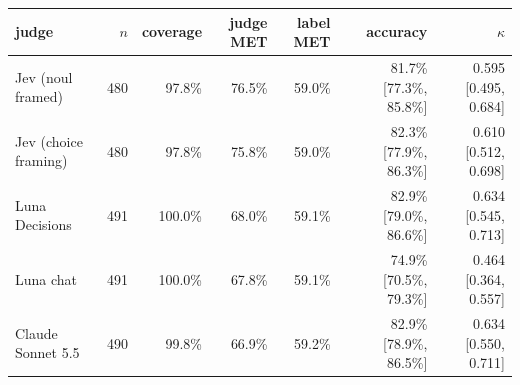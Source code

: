 \begin{tabular}{lrrrrrr}
\toprule
judge & $n$ & coverage & judge MET & label MET & accuracy & $\kappa$ \\
\midrule
Jev (noul framed) & 480 & 97.8\% & 76.5\% & 59.0\% & 81.7\% [77.3\%, 85.8\%] & 0.595 [0.495, 0.684] \\
Jev (choice framing) & 480 & 97.8\% & 75.8\% & 59.0\% & 82.3\% [77.9\%, 86.3\%] & 0.610 [0.512, 0.698] \\
Luna Decisions & 491 & 100.0\% & 68.0\% & 59.1\% & 82.9\% [79.0\%, 86.6\%] & 0.634 [0.545, 0.713] \\
Luna chat & 491 & 100.0\% & 67.8\% & 59.1\% & 74.9\% [70.5\%, 79.3\%] & 0.464 [0.364, 0.557] \\
Claude Sonnet 5.5 & 490 & 99.8\% & 66.9\% & 59.2\% & 82.9\% [78.9\%, 86.5\%] & 0.634 [0.550, 0.711] \\
\bottomrule
\end{tabular}
